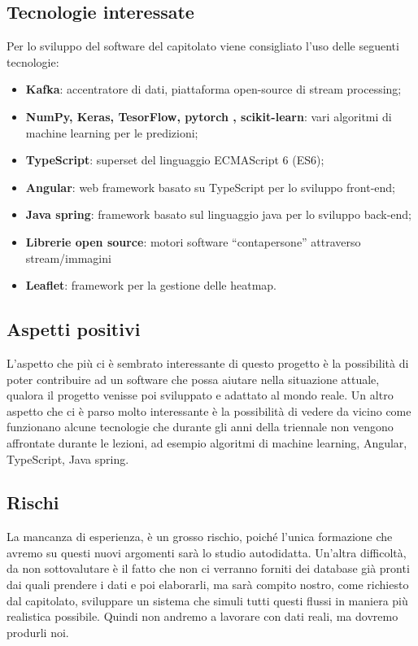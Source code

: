 \documentclass[../studio-di-fattibilita.tex]{subfiles}
\begin{document}
\subsection{Tecnologie interessate}%
\label{sub:c3_tecnologie_interessate}
Per lo sviluppo del software del capitolato viene consigliato l’uso delle seguenti tecnologie:
\begin{itemize}
  \item \textbf{Kafka}: accentratore di dati, piattaforma open-source di stream processing;
  \item \textbf{NumPy, Keras, TesorFlow, pytorch , scikit-learn}: vari algoritmi di machine learning per le predizioni;
  \item \textbf{TypeScript}: superset del linguaggio ECMAScript 6 (ES6);
  \item \textbf{Angular}: web framework basato su TypeScript per lo sviluppo front-end;
  \item \textbf{Java spring}: framework basato sul linguaggio java per lo sviluppo back-end;
  \item \textbf{Librerie open source}: motori software “contapersone” attraverso stream/immagini
  \item \textbf{Leaflet}: framework per la gestione delle heatmap.
\end{itemize}

\subsection{Aspetti positivi}%
\label{sub:c3_aspetti_positivi}
L’aspetto che più ci è sembrato interessante di questo progetto è la possibilità di poter contribuire ad un software che possa aiutare nella situazione attuale, qualora il progetto venisse poi sviluppato e adattato al mondo reale. Un altro aspetto che ci è parso molto interessante è la possibilità di vedere da vicino come funzionano alcune tecnologie che durante gli anni della triennale non vengono affrontate durante le lezioni, ad esempio algoritmi di machine learning, Angular, TypeScript, Java spring.

\subsection{Rischi}%
\label{sub:c3_rischi}
La mancanza di esperienza, è un grosso rischio, poiché l’unica formazione che avremo su questi nuovi argomenti sarà lo studio autodidatta. Un’altra difficoltà, da non sottovalutare è il fatto che non ci verranno forniti dei database già pronti dai quali prendere i dati e poi elaborarli, ma sarà compito nostro, come richiesto dal capitolato, sviluppare un sistema che simuli tutti questi flussi in maniera più realistica possibile. Quindi non andremo a lavorare con dati reali, ma dovremo produrli noi.
\end{document}

